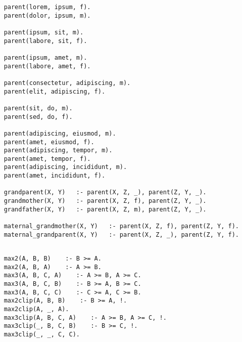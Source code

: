 \begin{lstlisting}
	parent(lorem, ipsum, f).
	parent(dolor, ipsum, m).

	parent(ipsum, sit, m).
	parent(labore, sit, f).

	parent(ipsum, amet, m).
	parent(labore, amet, f).

	parent(consectetur, adipiscing, m).
	parent(elit, adipiscing, f).

	parent(sit, do, m).
	parent(sed, do, f).

	parent(adipiscing, eiusmod, m).
	parent(amet, eiusmod, f).
	parent(adipiscing, tempor, m).
	parent(amet, tempor, f).
	parent(adipiscing, incididunt, m).
	parent(amet, incididunt, f).

	grandparent(X, Y)   :- parent(X, Z, _), parent(Z, Y, _).
	grandmother(X, Y)   :- parent(X, Z, f), parent(Z, Y, _).
	grandfather(X, Y)   :- parent(X, Z, m), parent(Z, Y, _).

	maternal_grandmother(X, Y)   :- parent(X, Z, f), parent(Z, Y, f).
	maternal_grandparent(X, Y)   :- parent(X, Z, _), parent(Z, Y, f).
	
\end{lstlisting}


\begin{lstlisting}
	max2(A, B, B)    :- B >= A.
	max2(A, B, A)    :- A >= B.
	max3(A, B, C, A)    :- A >= B, A >= C.
	max3(A, B, C, B)    :- B >= A, B >= C.
	max3(A, B, C, C)    :- C >= A, C >= B.
	max2clip(A, B, B)    :- B >= A, !.
	max2clip(A, _, A).
	max3clip(A, B, C, A)    :- A >= B, A >= C, !.
	max3clip(_, B, C, B)    :- B >= C, !.
	max3clip(_, _, C, C).
	
\end{lstlisting}

